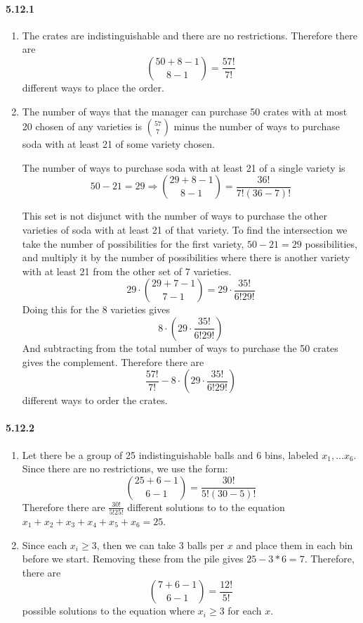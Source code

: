 \documentclass[11pt, letterpaper, twocolumn, fleqn]{article}
\begin{document}
\paragraph{5.12.1}
\begin{enumerate}
  \item The crates are indistinguishable and there are no restrictions. Therefore there are 
    $$\binom{50+8-1}{8-1} = \frac{57!}{7!}$$
  different ways to place the order.
  \item The number of ways that the manager can purchase 50 crates with at most 20 chosen of any varieties is $\binom{57}{7}$ minus the number of ways to purchase soda with at least 21 of some variety chosen.
  
  The number of ways to purchase soda with at least 21 of a single variety is 
  $$50-21 = 29 \Rightarrow \binom{29+8-1}{8-1} = \frac{36!}{7!(36-7)!}$$
  
  This set is not disjunct with the number of ways to purchase the other varieties of soda with at least 21 of that variety. To find the intersection we take the number of possibilities for the first variety,  $50-21 = 29$ possibilities, and multiply it by the number of possibilities where there is another variety with at least 21 from the other set of 7 varieties.
    $$29 \cdot \binom{29+7-1}{7-1} = 29 \cdot \frac{35!}{6!29!}$$
  Doing this for the 8 varieties gives 
    $$8 \cdot (29 \cdot \frac{35!}{6!29!})$$
  And subtracting from the total number of ways to purchase the 50 crates gives the complement. Therefore there are
    $$\frac{57!}{7!}- 8 \cdot (29 \cdot \frac{35!}{6!29!})$$
  different ways to order the crates.
\end{enumerate}

\paragraph{5.12.2}
\begin{enumerate}
  \item Let there be a group of 25 indistinguishable balls and 6 bins, labeled $x_1, ... x_6$. Since there are no restrictions, we use the form:
    $$\binom{25+6-1}{6-1} = \frac{30!}{5!(30-5)!}$$
  Therefore there are $\frac{30!}{5!25!}$ different solutions to to the equation $x_1+x_2+x_3+x_4+x_5+x_6=25$.
  \item Since each $x_i \geq 3$, then we can take 3 balls per $x$ and place them in each bin before we start. Removing these from the pile gives $25-3*6=7$.  Therefore, there are 
    $$\binom{7+6-1}{6-1} = \frac{12!}{5!}$$
  possible solutions to the equation where $x_i \geq 3$ for each $x$.
\end{enumerate}
\end{document}
